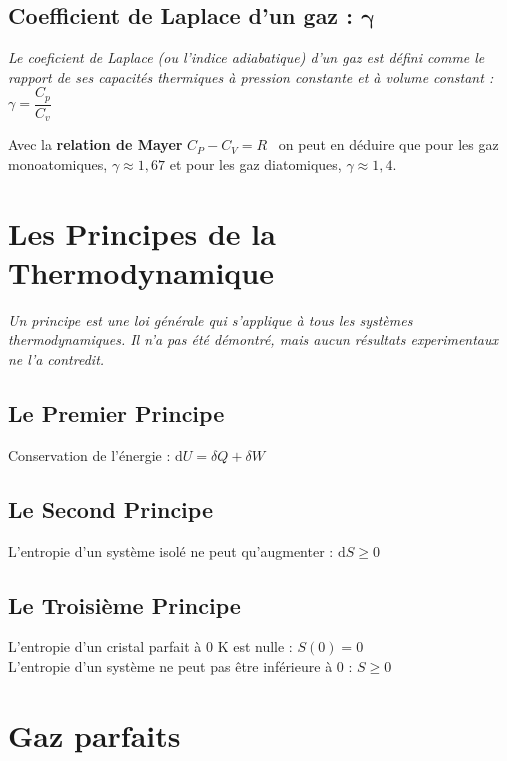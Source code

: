 \documentclass[a4paper,12pt]{article}
\newcommand{\diff}{\mathrm{d}} %
\begin{document}
    \subsection*{Coefficient de Laplace d'un gaz : $\bm{\gamma}$}

    \textit{Le coeficient de Laplace (ou l'indice adiabatique) d'un gaz est défini comme le rapport de
    ses capacités thermiques à pression constante et à volume constant :} $\boxed{\gamma = \dfrac{C_p}{C_v}}$

    Avec la \textbf{relation de Mayer} $C_P - C_V = R$ \ on peut en déduire que pour les gaz monoatomiques, $\gamma \approx 1,67$ et pour les gaz diatomiques, $\gamma \approx 1,4$.




\section{Les Principes de la Thermodynamique}

    \textit{Un principe est une loi générale qui s'applique à tous les systèmes thermodynamiques. Il n'a pas été démontré, mais aucun résultats experimentaux ne l'a contredit.}

    \begin{multicols}{2}

        \subsection*{Le Premier Principe}
        Conservation de l'énergie : $\boxed{\diff U = \delta Q + \delta W}$

        \subsection*{Le Second Principe}
        L'entropie d'un système isolé ne peut qu'augmenter : $\boxed{\diff S \geq 0}$

        \subsection*{Le Troisième Principe}
        L'entropie d'un cristal parfait à 0 K est nulle : $\boxed{S(0) = 0}$\\
        L'entropie d'un système ne peut pas être inférieure à 0 : $\boxed{S \geq 0}$

    \end{multicols}



\section{Gaz parfaits}
\end{document}
